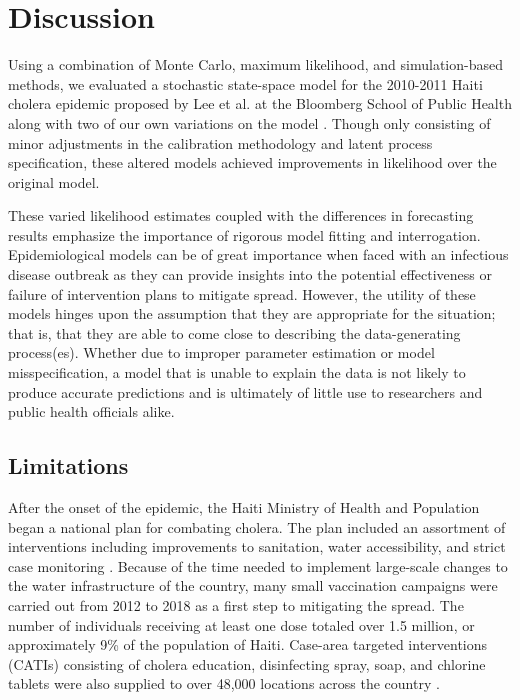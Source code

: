 \documentclass[12pt]{article}
\begin{document}
\section{Discussion}

 Using a combination of Monte Carlo, maximum likelihood, and simulation-based methods, we evaluated a stochastic state\hyp{}space model for the 2010-2011 Haiti cholera epidemic proposed by Lee et al. at the Bloomberg School of Public Health along with two of our own variations on the model \cite{Lee_haiticholera}. Though only consisting of minor adjustments in the calibration methodology and latent process specification, these altered models achieved improvements in likelihood over the original model.

  These varied likelihood estimates coupled with the differences in forecasting results emphasize the importance of rigorous model fitting and interrogation. Epidemiological models can be of great importance when faced with an infectious disease outbreak as they can provide insights into the potential effectiveness or failure of intervention plans to mitigate spread. However, the utility of these models hinges upon the assumption that they are appropriate for the situation; that is, that they are able to come close to describing the data-generating process(es). Whether due to improper parameter estimation or model misspecification, a model that is unable to explain the data is not likely to produce accurate predictions and is ultimately of little use to researchers and public health officials alike.
   
\subsection{Limitations}

 After the onset of the epidemic, the Haiti Ministry of Health and Population began a national plan for combating cholera. The plan included an assortment of interventions including improvements to sanitation, water accessibility, and strict case monitoring \cite{tohme}. Because of the time needed to implement large-scale changes to the water infrastructure of the country, many small vaccination campaigns were carried out from 2012 to 2018 as a first step to mitigating the spread. The number of individuals receiving at least one dose totaled over 1.5 million, or approximately 9\% of the population of Haiti. Case-area targeted interventions (CATIs) consisting of cholera education, disinfecting spray, soap, and chlorine tablets were also supplied to over 48,000 locations across the country \cite{Rebaudet}.
  
\end{document}
